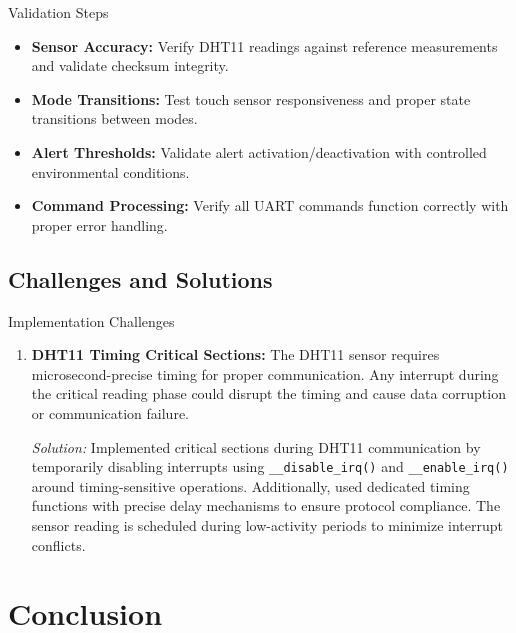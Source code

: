 \documentclass[12pt,a4paper]{article}
\begin{document}
\begin{mytitledbox}{Validation Steps}
\begin{itemize}[label=\textcolor{myblue}{$\checkmark$}, itemsep=1.5mm]
    \item \textbf{Sensor Accuracy:} Verify DHT11 readings against reference measurements and validate checksum integrity.
    \item \textbf{Mode Transitions:} Test touch sensor responsiveness and proper state transitions between modes.
    \item \textbf{Alert Thresholds:} Validate alert activation/deactivation with controlled environmental conditions.
    \item \textbf{Command Processing:} Verify all UART commands function correctly with proper error handling.
\end{itemize}
\end{mytitledbox}

\subsection{Challenges and Solutions}

\begin{mytitledbox}{Implementation Challenges}
\begin{enumerate}[label=\textcolor{myblue}{\textbf{\arabic*.}}, itemsep=1.5mm]    

    \item \textbf{DHT11 Timing Critical Sections:} 
    The DHT11 sensor requires microsecond-precise timing for proper communication. Any interrupt during the critical reading phase could disrupt the timing and cause data corruption or communication failure.
    
    \begin{solutionbox}
    \textit{Solution:} Implemented critical sections during DHT11 communication by temporarily disabling interrupts using \texttt{\_\_disable\_irq()} and \texttt{\_\_enable\_irq()} around timing-sensitive operations. Additionally, used dedicated timing functions with precise delay mechanisms to ensure protocol compliance. The sensor reading is scheduled during low-activity periods to minimize interrupt conflicts.
    \end{solutionbox}
    
\end{enumerate}
\end{mytitledbox}

\section{Conclusion}
\end{document}
